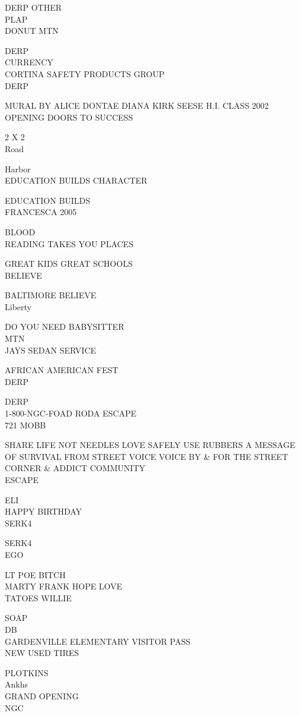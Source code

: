\documentclass[10pt,letterpaper]{article}
\begin{document}
DERP OTHER\\
PLAP\\
DONUT MTN

DERP\\
CURRENCY\\
CORTINA SAFETY PRODUCTS GROUP\\
DERP

MURAL BY ALICE DONTAE DIANA KIRK SEESE H.I. CLASS 2002\\
OPENING DOORS TO SUCCESS

2 X 2\\
Road

Harbor\\
EDUCATION BUILDS CHARACTER

EDUCATION BUILDS\\
FRANCESCA 2005

BLOOD\\
READING TAKES YOU PLACES

GREAT KIDS GREAT SCHOOLS\\
BELIEVE

BALTIMORE BELIEVE\\
Liberty

DO YOU NEED BABYSITTER\\
MTN\\
JAYS SEDAN SERVICE

AFRICAN AMERICAN FEST\\
DERP

DERP\\
1{-}800{-}NGC{-}FOAD RODA ESCAPE\\
721 MOBB

SHARE LIFE NOT NEEDLES LOVE SAFELY USE RUBBERS A MESSAGE OF SURVIVAL FROM STREET VOICE VOICE BY \& FOR THE STREET CORNER \& ADDICT COMMUNITY\\
ESCAPE

ELI\\
HAPPY BIRTHDAY\\
SERK4

SERK4\\
EGO

LT POE BITCH\\
MARTY FRANK HOPE LOVE\\
TATOES WILLIE

SOAP\\
DB\\
GARDENVILLE ELEMENTARY VISITOR PASS\\
NEW USED TIRES

PLOTKINS\\
Ankhs\\
GRAND OPENING\\
NGC
\end{document}
